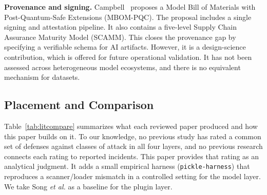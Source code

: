 \documentclass[conference]{IEEEtran}
\begin{document}
\textbf{Provenance and signing.} Campbell~\cite{campbell2026} proposes a Model Bill of Materials with Post-Quantum-Safe Extensions (MBOM-PQC). The proposal includes a single signing and attestation pipeline. It also contains a five-level Supply Chain Assurance Maturity Model (SCAMM). This closes the provenance gap by specifying a verifiable schema for AI artifacts. However, it is a design-science contribution, which is offered for future operational validation. It has not been assessed across heterogeneous model ecosystems, and there is no equivalent mechanism for datasets.

\subsection{Placement and Comparison}
\label{sec:positioning}

Table~\ref{tab:litcompare} summarizes what each reviewed paper produced and how this paper builds on it. To our knowledge, no previous study has rated a common set of defenses against classes of attack in all four layers, and no previous research connects each rating to reported incidents. This paper provides that rating as an analytical judgment. It adds a small empirical harness (\texttt{pickle-harness}) that reproduces a scanner/loader mismatch in a controlled setting for the model layer. We take Song \textit{et al.} as a baseline for the plugin layer.
\end{document}
